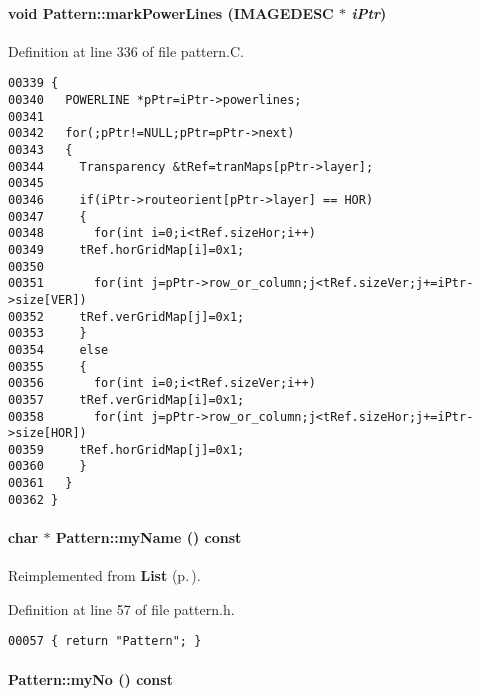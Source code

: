 \paragraph{\setlength{\rightskip}{0pt plus 5cm}void Pattern::mark\-Power\-Lines ({\bf IMAGEDESC} $\ast$ {\em i\-Ptr})\hspace{0.3cm}{\tt  [private]}}\hfill



Definition at line 336 of file pattern.C.\small\begin{verbatim}00339 {
00340   POWERLINE *pPtr=iPtr->powerlines;
00341 
00342   for(;pPtr!=NULL;pPtr=pPtr->next)
00343   {
00344     Transparency &tRef=tranMaps[pPtr->layer];
00345 
00346     if(iPtr->routeorient[pPtr->layer] == HOR)
00347     {
00348       for(int i=0;i<tRef.sizeHor;i++)
00349     tRef.horGridMap[i]=0x1;
00350 
00351       for(int j=pPtr->row_or_column;j<tRef.sizeVer;j+=iPtr->size[VER])
00352     tRef.verGridMap[j]=0x1;
00353     }
00354     else
00355     {
00356       for(int i=0;i<tRef.sizeVer;i++)
00357     tRef.verGridMap[i]=0x1;
00358       for(int j=pPtr->row_or_column;j<tRef.sizeHor;j+=iPtr->size[HOR])
00359     tRef.horGridMap[j]=0x1;
00360     }
00361   }
00362 }
\end{verbatim}\normalsize 
\label{Pattern_a3}
\paragraph{\setlength{\rightskip}{0pt plus 5cm}char $\ast$ Pattern::my\-Name () const\hspace{0.3cm}{\tt  [inline, virtual]}}\hfill



Reimplemented from {\bf List} {\rm (p.\,\pageref{List_a7})}.

Definition at line 57 of file pattern.h.\small\begin{verbatim}00057 { return "Pattern"; }
\end{verbatim}\normalsize 
\label{Pattern_a2}
\paragraph{ Pattern::my\-No () const\hspace{0.3cm}{\tt  [inline, virtual]}}\hfill



